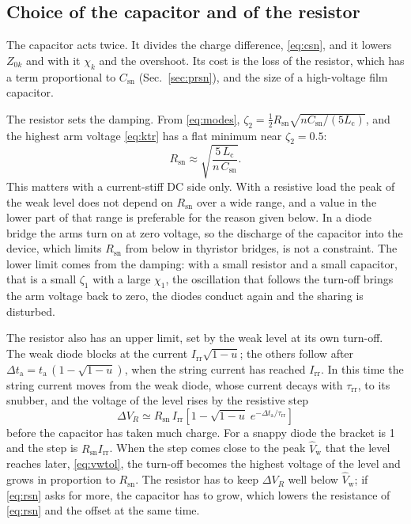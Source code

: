 \documentclass[10pt,a4paper]{scrartcl}
\newcommand{\Irr}{I_\mathrm{rr}}
\newcommand{\Csn}{C_\mathrm{sn}}
\newcommand{\Rsn}{R_\mathrm{sn}}
\newcommand{\Lc}{L_\mathrm{c}}
\newcommand{\Vw}{\hat V_\mathrm{w}}
\newcommand{\ta}{t_\mathrm{a}}
\newcommand{\trr}{\tau_\mathrm{rr}}
\begin{document}
\subsection{Choice of the capacitor and of the resistor}
\label{sec:rsnchoice}
The capacitor acts twice. It divides the charge difference, \eqref{eq:csn}, and it lowers $Z_{0k}$ and with it $\chi_k$ and the overshoot. Its cost is the loss of the resistor, which has a term proportional to $\Csn$ (Sec.~\ref{sec:prsn}), and the size of a high-voltage film capacitor.

The resistor sets the damping. From \eqref{eq:modes}, $\zeta_2 = \tfrac12\Rsn\sqrt{n\Csn/(5\Lc)}$, and the highest arm voltage \eqref{eq:ktr} has a flat minimum near $\zeta_2 = 0.5$:
\begin{equation}
\Rsn \approx \sqrt{\frac{5\,\Lc}{n\,\Csn}} .
\label{eq:rsn}
\end{equation}
This matters with a current-stiff DC side only. With a resistive load the peak of the weak level does not depend on $\Rsn$ over a wide range, and a value in the lower part of that range is preferable for the reason given below. In a diode bridge the arms turn on at zero voltage, so the discharge of the capacitor into the device, which limits $\Rsn$ from below in thyristor bridges, is not a constraint. The lower limit comes from the damping: with a small resistor and a small capacitor, that is a small $\zeta_1$ with a large $\chi_1$, the oscillation that follows the turn-off brings the arm voltage back to zero, the diodes conduct again and the sharing is disturbed.

The resistor also has an upper limit, set by the weak level at its own turn-off. The weak diode blocks at the current $\Irr\sqrt{1-u}$; the others follow after $\Delta\ta = \ta\,(1 - \sqrt{1-u})$, when the string current has reached $\Irr$. In this time the string current moves from the weak diode, whose current decays with $\trr$, to its snubber, and the voltage of the level rises by the resistive step
\begin{equation}
\Delta V_R \simeq \Rsn\,\Irr\left[1 - \sqrt{1-u}\;e^{-\Delta\ta/\trr}\right]
\label{eq:rstep}
\end{equation}
before the capacitor has taken much charge. For a snappy diode the bracket is 1 and the step is $\Rsn\Irr$. When the step comes close to the peak $\Vw$ that the level reaches later, \eqref{eq:vwtol}, the turn-off becomes the highest voltage of the level and grows in proportion to $\Rsn$. The resistor has to keep $\Delta V_R$ well below $\Vw$; if \eqref{eq:rsn} asks for more, the capacitor has to grow, which lowers the resistance of \eqref{eq:rsn} and the offset at the same time.
\end{document}
